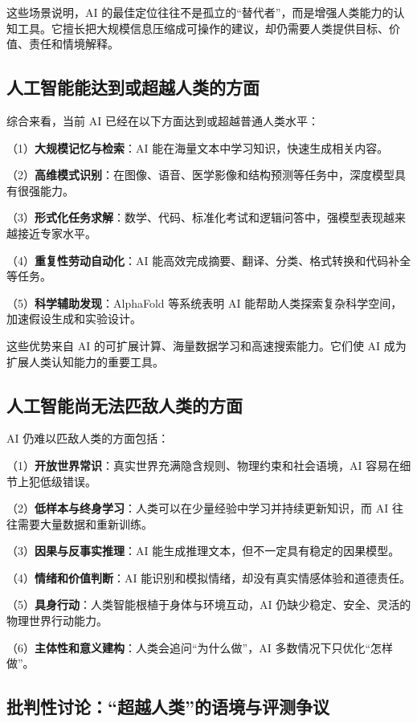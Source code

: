 \documentclass[UTF8,zihao=-4,a4paper]{ctexart}
\begin{document}
这些场景说明，AI 的最佳定位往往不是孤立的“替代者”，而是增强人类能力的认知工具。它擅长把大规模信息压缩成可操作的建议，却仍需要人类提供目标、价值、责任和情境解释。

\subsection{人工智能能达到或超越人类的方面}

综合来看，当前 AI 已经在以下方面达到或超越普通人类水平：

（1）\textbf{大规模记忆与检索}：AI 能在海量文本中学习知识，快速生成相关内容。

（2）\textbf{高维模式识别}：在图像、语音、医学影像和结构预测等任务中，深度模型具有很强能力。

（3）\textbf{形式化任务求解}：数学、代码、标准化考试和逻辑问答中，强模型表现越来越接近专家水平。

（4）\textbf{重复性劳动自动化}：AI 能高效完成摘要、翻译、分类、格式转换和代码补全等任务。

（5）\textbf{科学辅助发现}：AlphaFold 等系统表明 AI 能帮助人类探索复杂科学空间，加速假设生成和实验设计。

这些优势来自 AI 的可扩展计算、海量数据学习和高速搜索能力。它们使 AI 成为扩展人类认知能力的重要工具。

\subsection{人工智能尚无法匹敌人类的方面}

AI 仍难以匹敌人类的方面包括：

（1）\textbf{开放世界常识}：真实世界充满隐含规则、物理约束和社会语境，AI 容易在细节上犯低级错误。

（2）\textbf{低样本与终身学习}：人类可以在少量经验中学习并持续更新知识，而 AI 往往需要大量数据和重新训练。

（3）\textbf{因果与反事实推理}：AI 能生成推理文本，但不一定具有稳定的因果模型。

（4）\textbf{情绪和价值判断}：AI 能识别和模拟情绪，却没有真实情感体验和道德责任。

（5）\textbf{具身行动}：人类智能根植于身体与环境互动，AI 仍缺少稳定、安全、灵活的物理世界行动能力。

（6）\textbf{主体性和意义建构}：人类会追问“为什么做”，AI 多数情况下只优化“怎样做”。

\subsection{批判性讨论：“超越人类”的语境与评测争议}
\end{document}
